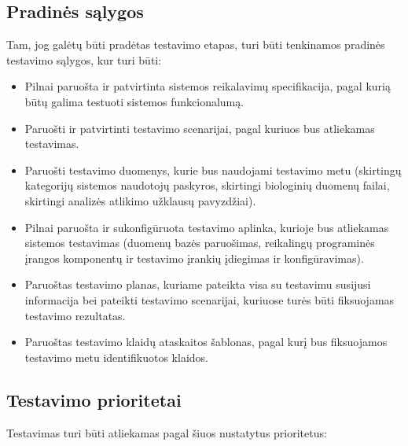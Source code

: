 \documentclass[12pt]{article}
\begin{document}
\subsection{Pradinės sąlygos}
Tam, jog galėtų būti pradėtas testavimo etapas, turi būti tenkinamos pradinės
testavimo sąlygos, kur turi būti:

\begin{itemize}
    \item Pilnai paruošta ir patvirtinta sistemos reikalavimų specifikacija,
    pagal kurią būtų galima testuoti sistemos funkcionalumą.
    \item Paruošti ir patvirtinti testavimo scenarijai, pagal kuriuos bus
    atliekamas testavimas.
    \item Paruošti testavimo duomenys, kurie bus naudojami testavimo metu
    (skirtingų kategorijų sistemos naudotojų paskyros, skirtingi biologinių
    duomenų failai, skirtingi analizės atlikimo užklausų pavyzdžiai).
    \item Pilnai paruošta ir sukonfigūruota testavimo aplinka, kurioje bus
    atliekamas sistemos testavimas (duomenų bazės paruošimas, reikalingų
    programinės įrangos komponentų ir testavimo įrankių įdiegimas ir
    konfigūravimas).
    \item Paruoštas testavimo planas, kuriame pateikta visa su testavimu
    susijusi informacija bei pateikti testavimo scenarijai, kuriuose turės būti
    fiksuojamas testavimo rezultatas.
    \item Paruoštas testavimo klaidų ataskaitos šablonas, pagal kurį bus
    fiksuojamos testavimo metu identifikuotos klaidos.
\end{itemize}

\subsection{Testavimo prioritetai}
Testavimas turi būti atliekamas pagal šiuos nustatytus prioritetus:
\end{document}
